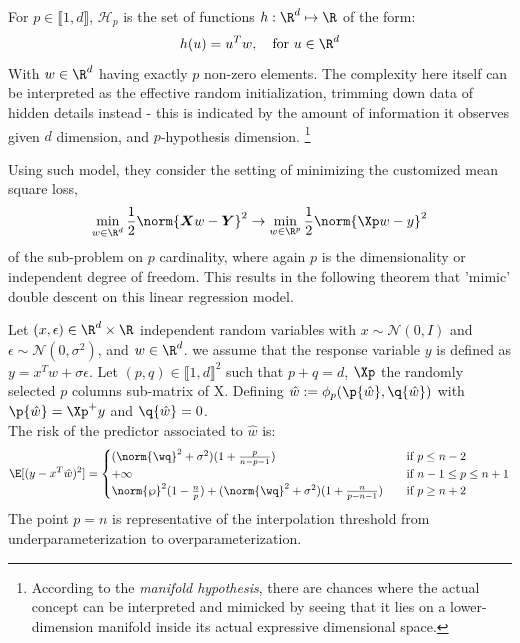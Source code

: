 \begin{definition}
For $p \in \llbracket1,d\rrbracket$, $\mathcal{H}_p$ is the set of functions $h:\R^d\mapsto \R$ of the form:
$$
h(u)=u^Tw,\quad \text{for }u \in \R^d
$$
With $w \in \R^d$ having exactly $p$ non-zero elements. The complexity here itself can be interpreted as the effective random initialization, trimming down data of hidden details instead - this is indicated by the amount of information it observes given $d$ dimension, and $p$-hypothesis dimension. \footnote{According to the \textit{manifold hypothesis}, there are chances where the actual concept can be interpreted and mimicked by seeing that it lies on a lower-dimension manifold inside its actual expressive dimensional space. }
\end{definition}
Using such model, they consider the setting of minimizing the customized mean square loss, 
\begin{equation}
\label{eq:linear_gaussian_erm}
\min_{w\in \R^d} \frac{1}{2}\norm{\bm{X} w - \bm{Y}}^2 \to \min_{w\in \R^p} \frac{1}{2}\norm{\bm{\Xp} w - y}^2
\end{equation}
of the sub-problem on $p$ cardinality, where again $p$ is the dimensionality or independent degree of freedom. This results in the following theorem that 'mimic' double descent on this linear regression model.
\begin{theorem}
\label{thm:double_descent_lr}
Let $(x, \epsilon)\in \R^d\times\R$ independent random variables with $x \sim \mathcal{N}(0,I)$  and $\epsilon \sim \mathcal{N}(0,\sigma^2)$, and $w \in \R^d$. we assume that the response variable $y$ is defined as $y=x^Tw +\sigma \epsilon$. Let $(p,q) \in \llbracket 1, d\rrbracket^2$ such that $p+q=d$, $\bm{\Xp}$ the randomly selected $p$ columns sub-matrix of X. Defining $\hat w:=\phi_p(\p{\hat w},\q{\hat w})$ with $\p{\hat w}=\bm{\Xp}^+y$ and $\q{\hat w} = 0$.\\
The risk of the predictor associated to $\hat w$ is:
\begin{equation}
    \E[(y-x^T\hat w)^2] = 
\begin{cases}
(\norm{\wq}^2+\sigma^2)(1+\frac{p}{n-p-1}) &\quad\text{if } p\leq  n-2\\
+\infty &\quad\text{if }n-1 \leq p\leq  n+1\\
\norm{\wp}^2(1-\frac{n}{p}) +  (\norm{\wq}^2+\sigma^2)(1+\frac{n}{p-n-1}) &\quad\text{if }p\geq n+2\end{cases}
\end{equation}
The point $p=n$ is representative of the interpolation threshold from underparameterization to overparameterization. 
\end{theorem}

